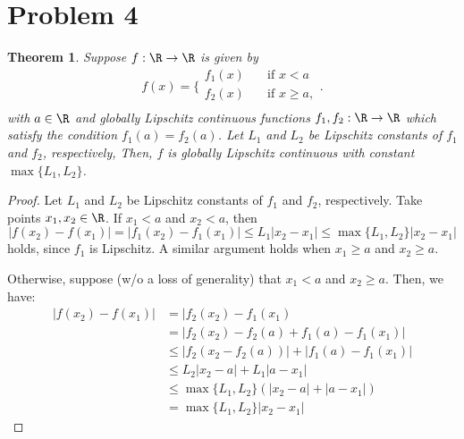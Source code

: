 \documentclass{homework}
\newtheorem{theorem}{Theorem}
\begin{document}
\section{Problem 4}

\begin{theorem}
    Suppose $f: \R \to \R$ is given by
    \begin{equation*}
        f(x) = \biggl\{
            \begin{array}{ll}
                f_1(x) &\quad \text{if } x < a \\
                f_2(x) &\quad \text{if } x \geq a, \\
            \end{array}
        \biggr.
    \end{equation*}
    with $a \in \R$ and globally Lipschitz continuous functions $f_1, f_2: \R \to \R$
     which satisfy the condition $f_1(a) = f_2(a)$. Let
    $L_1$ and $L_2$ be Lipschitz constants of $f_1$ and $f_2$, respectively,
    Then, $f$ is globally Lipschitz continuous with constant $\max\{L_1, L_2\}$.
    \label{thm:piecewise}
\end{theorem}

\begin{proof}
    Let $L_1$ and $L_2$ be Lipschitz constants of $f_1$ and $f_2$, respectively.
    Take points $x_1,x_2\in\R$. If $x_1<a$ and $x_2<a$, then
    \begin{equation*}
        |f(x_2) - f(x_1)| = |f_1(x_2) - f_1(x_1)| \leq L_1 |x_2 - x_1|
            \leq \max\{L_1, L_2\} |x_2 - x_1|
    \end{equation*}
    holds, since $f_1$ is Lipschitz. A similar argument holds when
     $x_1\geq a$ and $x_2 \geq a$.

    Otherwise, suppose (w/o a loss of generality) that $x_1 < a$ and $x_2 \geq a$.
    Then, we have:
    \begin{align*}
        |f(x_2) - f(x_1)| &= | f_2(x_2) - f_1(x_1) \\
            &= |f_2(x_2) - f_2(a) + f_1(a) - f_1(x_1)| \\
            &\leq |f_2(x_2 - f_2(a))| + | f_1(a) - f_1(x_1) | \\
            &\leq L_2 |x_2 - a| + L_1 |a - x_1| \\
            &\leq \max\{L_1, L_2\} (|x_2 - a| + |a - x_1|) \\
            &= \max\{L_1, L_2\} |x_2 - x_1|
    \end{align*}
\end{proof}
\end{document}
